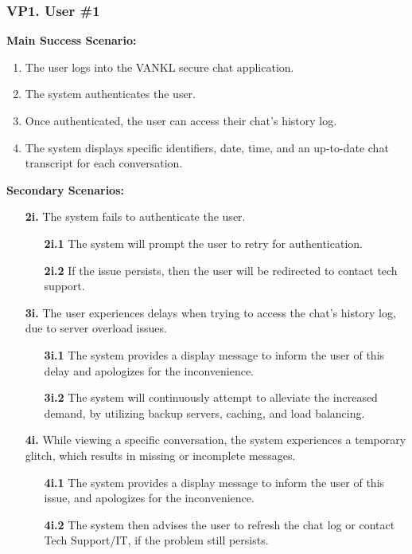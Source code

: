 \documentclass[]{article}
\begin{document}
\subsubsection*{VP1. User \#1}
\textbf{Main Success Scenario:}
\begin{enumerate}
	\item The user logs into the VANKL secure chat application.
	\item The system authenticates the user.
	\item Once authenticated, the user can access their chat’s history log.
	\item The system displays specific identifiers, date, time, and an up-to-date chat transcript for each conversation.
\end{enumerate}
\textbf{Secondary Scenarios:}
\begin{enumerate}
	\item[\textbf{2i.}] The system fails to authenticate the user.
		\begin{enumerate}
			\item[\textbf{2i.1}] The system will prompt the user to retry for authentication.
			\item[\textbf{2i.2}] If the issue persists, then the user will be redirected to contact tech support.
		\end{enumerate}
	\item[\textbf{3i.}] The user experiences delays when trying to access the chat’s history log, due to server overload issues.
		\begin{enumerate}
			\item[\textbf{3i.1}] The system provides a display message to inform the user of this delay and apologizes for the inconvenience.
			\item[\textbf{3i.2}] The system will continuously attempt to alleviate the increased demand, by utilizing backup servers, caching, and load balancing.
		\end{enumerate}
	\item[\textbf{4i.}] While viewing a specific conversation, the system experiences a temporary glitch, which results in missing or incomplete messages.
		\begin{enumerate}
			\item[\textbf{4i.1}] The system provides a display message to inform the user of this issue, and apologizes for the inconvenience.
			\item[\textbf{4i.2}] The system then advises the user to refresh the chat log or contact Tech Support/IT, if the problem still persists.
		\end{enumerate}
\end{enumerate}
\end{document}
